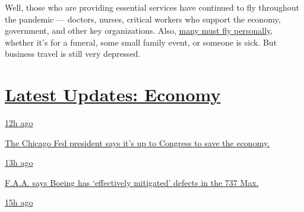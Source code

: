 Well, those who are providing essential services have continued to fly
throughout the pandemic --- doctors, nurses, critical workers who
support the economy, government, and other key organizations. Also,
\href{https://www.nytimes3xbfgragh.onion/2020/06/09/business/flying-coronovirus.html}{many
must fly personally}, whether it's for a funeral, some small family
event, or someone is sick. But business travel is still very depressed.

\hypertarget{latest-updates-economy}{%
\section{\texorpdfstring{\href{https://www.nytimes3xbfgragh.onion/live/2020/08/03/business/stock-market-today-coronavirus?action=click\&pgtype=Article\&state=default\&region=MAIN_CONTENT_1\&context=storylines_live_updates}{Latest
Updates:
Economy}}{Latest Updates: Economy}}\label{latest-updates-economy}}

\href{https://www.nytimes3xbfgragh.onion/live/2020/08/03/business/stock-market-today-coronavirus?action=click\&pgtype=Article\&state=default\&region=MAIN_CONTENT_1\&context=storylines_live_updates\#the-chicago-fed-president-says-its-up-to-congress-to-save-the-economy}{12h
ago}

\href{https://www.nytimes3xbfgragh.onion/live/2020/08/03/business/stock-market-today-coronavirus?action=click\&pgtype=Article\&state=default\&region=MAIN_CONTENT_1\&context=storylines_live_updates\#the-chicago-fed-president-says-its-up-to-congress-to-save-the-economy}{The
Chicago Fed president says it's up to Congress to save the economy.}

\href{https://www.nytimes3xbfgragh.onion/live/2020/08/03/business/stock-market-today-coronavirus?action=click\&pgtype=Article\&state=default\&region=MAIN_CONTENT_1\&context=storylines_live_updates\#faa-says-boeing-has-effectively-mitigated-defects-in-the-737-max}{13h
ago}

\href{https://www.nytimes3xbfgragh.onion/live/2020/08/03/business/stock-market-today-coronavirus?action=click\&pgtype=Article\&state=default\&region=MAIN_CONTENT_1\&context=storylines_live_updates\#faa-says-boeing-has-effectively-mitigated-defects-in-the-737-max}{F.A.A.
says Boeing has `effectively mitigated' defects in the 737 Max.}

\href{https://www.nytimes3xbfgragh.onion/live/2020/08/03/business/stock-market-today-coronavirus?action=click\&pgtype=Article\&state=default\&region=MAIN_CONTENT_1\&context=storylines_live_updates\#small-businesses-got-emergency-loans-but-not-what-they-expected}{15h
ago}

